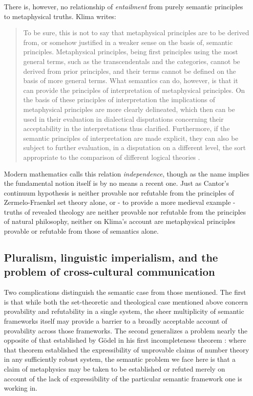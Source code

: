 \documentclass[]{article}
\begin{document}
There is, however, no relationship of \emph{entailment} from purely semantic principles to metaphysical truths. Klima writes: 
\begin{quote}
To be sure, this is not to say that metaphysical principles are to be derived from, or somehow justified 
in a weaker sense on the basis of, semantic principles. Metaphysical principles, being first principles 
using the most general terms, such as the transcendentals and the categories, cannot be derived from 
prior principles, and their terms cannot be defined on the basis of more general terms. What 
semantics can do, however, is that it can provide the principles of interpretation of metaphysical 
principles. On the basis of these principles of interpretation the implications of metaphysical 
principles are more clearly delineated, which then can be used in their evaluation in dialectical 
disputations concerning their acceptability in the interpretations thus clarified. Furthermore, if the 
semantic principles of interpretation are made explicit, they can also be subject to further evaluation, 
in a disputation on a different level, the sort appropriate to the comparison of different logical 
theories  \autocite[49]{Klima2011b}.
\end{quote}
Modern mathematics calls this relation \emph{independence}, 
though as the name implies the fundamental notion itself is by no means a recent one. 
Just as Cantor's continuum hypothesis is neither provable nor refutable from the principles of Zermelo-Fraenkel set theory alone, 
or - to provide a more medieval example - 
truths of revealed theology are neither provable nor refutable from the principles of natural philosophy, 
neither on Klima's account are metaphysical principles provable or refutable from those of semantics alone. 

\subsection{Pluralism, linguistic imperialism, and the problem of cross-cultural communication}
Two complications distinguish the semantic case from those mentioned. 
The first is that while both the set-theoretic and theological case mentioned above concern provability and refutability in a single system, 
the sheer multiplicity of semantic frameworks itself may provide a barrier to a broadly acceptable account of provability across those frameworks. 
The second generalizes a problem nearly the opposite of that established by G\"{o}del in his first incompleteness theorem \autocite{Godel1931}:
where that theorem established the expressibility of unprovable claims of number theory in any sufficiently robust system, 
the semantic problem we face here is that a claim of metaphysics may be taken to be established or refuted merely on account of the lack of expressibility of the particular semantic framework one is working in. 
\end{document}
